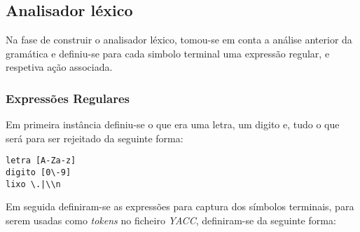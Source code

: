 \subsection{Analisador léxico}
\label{subsec:lexico:desenho}


Na fase de construir o analisador léxico, tomou-se em conta a análise anterior
da gramática e definiu-se para cada simbolo terminal uma expressão regular,
e respetiva ação associada.


\subsubsection{Expressões Regulares}
\label{subsec:subsubsec:ers:desenho}

Em primeira instância definiu-se o que era uma letra, um digito e, tudo o que
será para ser rejeitado da seguinte forma:


\begin{verbatim}
letra [A-Za-z]
digito [0\-9]
lixo \.|\\n
\end{verbatim}


Em seguida definiram-se as expressões para captura dos símbolos terminais, para
serem usadas como \emph{tokens} no ficheiro \emph{YACC}, definiram-se da
seguinte forma:


